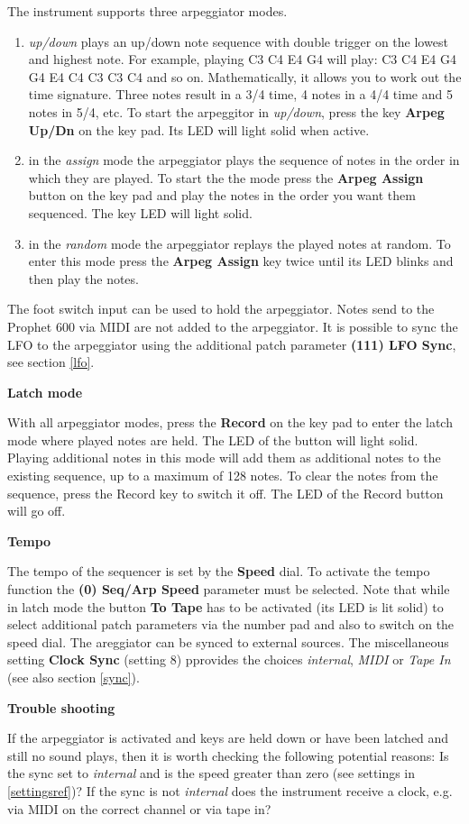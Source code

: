 The instrument supports three arpeggiator modes.

\begin{enumerate}
  \item \textit{up/down} plays an up/down note sequence with double trigger on the lowest and highest note. For example, playing C3 C4 E4 G4 will play: C3 C4 E4 G4 G4  E4 C4 C3 C3 C4 and so on. Mathematically, it allows you to work out the time signature.  Three notes result in a 3/4 time, 4 notes in a 4/4 time and 5 notes in 5/4, etc. To start the arpeggitor in \textit{up/down}, press the key \textbf{Arpeg Up/Dn} on the key pad. Its LED will light solid when active.
  \item in the \textit{assign} mode the arpeggiator plays the sequence of notes in the order in which they are played. To start the the mode press the \textbf{Arpeg Assign} button on the key pad and play the notes in the order you want them sequenced. The key LED will light solid.
  \item in the \textit{random} mode the arpeggiator replays the played notes at random.  To enter this mode press the \textbf{Arpeg Assign} key twice until its LED blinks and then play the notes. 
\end{enumerate}

The foot switch input can be used to hold the arpeggiator. Notes send to the Prophet 600 via MIDI are not added to the arpeggiator. It is possible to sync the LFO to the arpeggiator using the additional patch parameter \textbf{(111) LFO Sync}, see section \ref{lfo}.

\textbf{Latch mode}

With all arpeggiator modes, press the \textbf{Record} on the key pad to enter the latch mode where played notes are held. The LED of the button will light solid. Playing additional notes in this mode will add them as additional notes to the existing sequence, up to a maximum of 128 notes. To clear the notes from the sequence, press the Record key to switch it off. The LED of the Record button will go off.

\textbf{Tempo}

The tempo of the sequencer is set by the \textbf{Speed} dial. To activate the tempo function the \textbf{(0) Seq/Arp Speed} parameter must be selected. Note that while in latch mode the button \textbf{To Tape} has to be activated (its LED is lit solid) to select additional patch parameters via the number pad and also to switch on the speed dial. The  areggiator can be synced to external sources. The miscellaneous setting \textbf{Clock Sync} (setting 8) pprovides the choices \textit{internal}, \textit{MIDI} or \textit{Tape In} (see also section \ref{sync}).

\textbf{Trouble shooting}

If the arpeggiator is activated and keys are held down or have been latched and still no sound plays, then it is worth checking the following potential reasons: Is the sync set to \textit{internal} and is the speed greater than zero (see settings in \ref{settingsref})? If the sync is not \textit{internal} does the instrument receive a clock, e.g. via MIDI on the correct channel or via tape in?
